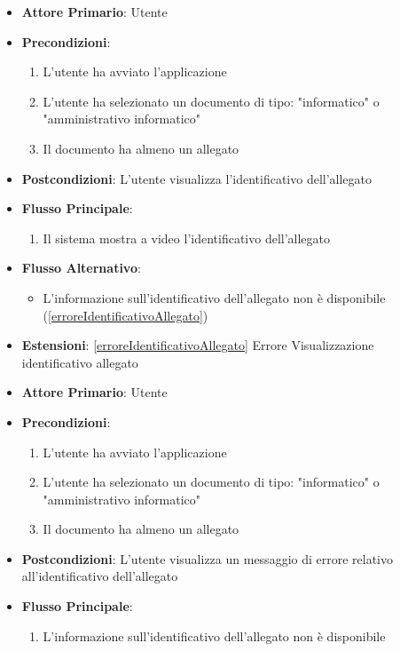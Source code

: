 \begin{itemize}
    \item \textbf{Attore Primario}: Utente
    \item \textbf{Precondizioni}:
    \begin{enumerate}
        \item L'utente ha avviato l'applicazione
        \item L'utente ha selezionato un documento di tipo: "informatico" o "amministrativo informatico"
        \item Il documento ha almeno un allegato
    \end{enumerate}
    \item \textbf{Postcondizioni}: L'utente visualizza l'identificativo dell'allegato
    \item \textbf{Flusso Principale}:
    \begin{enumerate}
        \item Il sistema mostra a video l'identificativo dell'allegato
    \end{enumerate}
    \item \textbf{Flusso Alternativo}:
    \begin{itemize}
        \item L'informazione sull'identificativo dell'allegato non è disponibile (\ref{erroreIdentificativoAllegato})
    \end{itemize}
    \item \textbf{Estensioni}: \ref{erroreIdentificativoAllegato} Errore Visualizzazione identificativo allegato
\end{itemize}

\begin{itemize}
    \item \textbf{Attore Primario}: Utente
    \item \textbf{Precondizioni}:
    \begin{enumerate}
        \item L'utente ha avviato l'applicazione
        \item L'utente ha selezionato un documento di tipo: "informatico" o "amministrativo informatico"
        \item Il documento ha almeno un allegato
    \end{enumerate}
    \item \textbf{Postcondizioni}: L'utente visualizza un messaggio di errore relativo all'identificativo dell'allegato
    \item \textbf{Flusso Principale}:
    \begin{enumerate}
        \item L'informazione sull'identificativo dell'allegato non è disponibile
    \end{enumerate}
\end{itemize}

